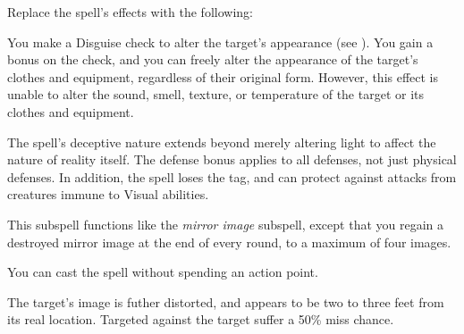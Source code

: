 


Replace the spell's effects with the following:
\begin{spellcontent}

\begin{augmenteffects}



\spelleffect
You make a Disguise check to alter the target's appearance (see ).
You gain a  bonus on the check, and you can freely alter the appearance of the target's clothes and equipment, regardless of their original form.
However, this effect is unable to alter the sound, smell, texture, or temperature of the target or its clothes and equipment.








\end{augmenteffects}

\end{spellcontent}






The spell's deceptive nature extends beyond merely altering light to affect the nature of reality itself.
The defense bonus applies to all defenses, not just physical defenses.
In addition, the spell loses the  tag, and can protect against attacks from creatures immune to Visual abilities.







This subspell functions like the \textit{mirror image} subspell, except that you regain a destroyed mirror image at the end of every round, to a maximum of four images.






You can cast the spell without spending an action point.






The target's image is futher distorted, and appears to be two to three feet from its real location.
Targeted  against the target suffer a 50\% miss chance.





